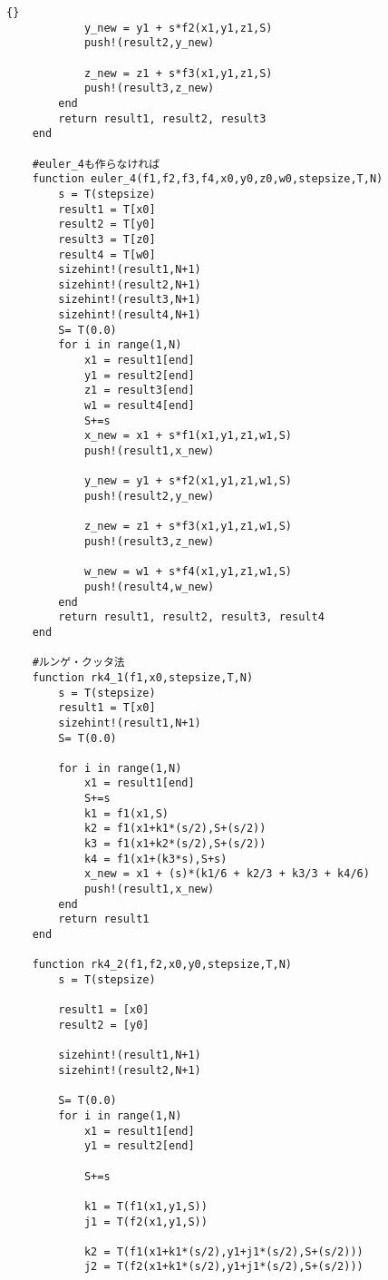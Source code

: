 \begin{lstlisting}[caption =\text{numerical\_scheme.jl}, label = a]{}
            y_new = y1 + s*f2(x1,y1,z1,S)
            push!(result2,y_new)

            z_new = z1 + s*f3(x1,y1,z1,S)
            push!(result3,z_new)
        end
        return result1, result2, result3
    end

    #euler_4も作らなければ
    function euler_4(f1,f2,f3,f4,x0,y0,z0,w0,stepsize,T,N)
        s = T(stepsize)
        result1 = T[x0]
        result2 = T[y0]
        result3 = T[z0] 
        result4 = T[w0]
        sizehint!(result1,N+1)
        sizehint!(result2,N+1)
        sizehint!(result3,N+1)
        sizehint!(result4,N+1)
        S= T(0.0)
        for i in range(1,N)
            x1 = result1[end]
            y1 = result2[end]
            z1 = result3[end]
            w1 = result4[end]
            S+=s
            x_new = x1 + s*f1(x1,y1,z1,w1,S)
            push!(result1,x_new)

            y_new = y1 + s*f2(x1,y1,z1,w1,S)
            push!(result2,y_new)

            z_new = z1 + s*f3(x1,y1,z1,w1,S)
            push!(result3,z_new)

            w_new = w1 + s*f4(x1,y1,z1,w1,S)
            push!(result4,w_new)
        end
        return result1, result2, result3, result4
    end

    #ルンゲ・クッタ法
    function rk4_1(f1,x0,stepsize,T,N)
        s = T(stepsize)
        result1 = T[x0]
        sizehint!(result1,N+1)
        S= T(0.0)

        for i in range(1,N)
            x1 = result1[end]
            S+=s
            k1 = f1(x1,S)
            k2 = f1(x1+k1*(s/2),S+(s/2))
            k3 = f1(x1+k2*(s/2),S+(s/2))
            k4 = f1(x1+(k3*s),S+s)
            x_new = x1 + (s)*(k1/6 + k2/3 + k3/3 + k4/6)
            push!(result1,x_new)
        end
        return result1
    end

    function rk4_2(f1,f2,x0,y0,stepsize,T,N)
        s = T(stepsize)

        result1 = [x0]
        result2 = [y0]

        sizehint!(result1,N+1)
        sizehint!(result2,N+1)

        S= T(0.0)
        for i in range(1,N)
            x1 = result1[end]
            y1 = result2[end]

            S+=s

            k1 = T(f1(x1,y1,S))
            j1 = T(f2(x1,y1,S))

            k2 = T(f1(x1+k1*(s/2),y1+j1*(s/2),S+(s/2)))
            j2 = T(f2(x1+k1*(s/2),y1+j1*(s/2),S+(s/2)))


\end{lstlisting}
